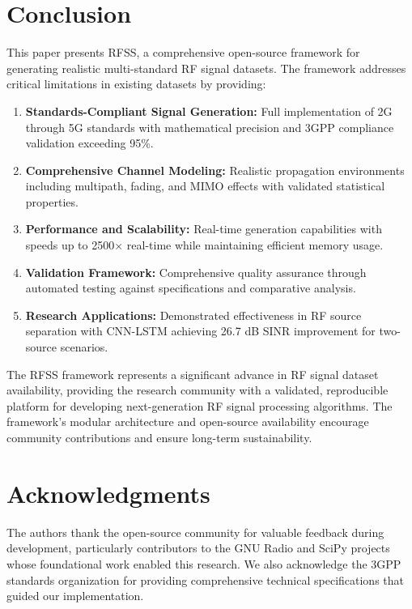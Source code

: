 \documentclass[twocolumn,10pt]{article}
\begin{document}
\section{Conclusion}

This paper presents RFSS, a comprehensive open-source framework for generating realistic multi-standard RF signal datasets. The framework addresses critical limitations in existing datasets by providing:

\begin{enumerate}
\item \textbf{Standards-Compliant Signal Generation:} Full implementation of 2G through 5G standards with mathematical precision and 3GPP compliance validation exceeding 95\%.

\item \textbf{Comprehensive Channel Modeling:} Realistic propagation environments including multipath, fading, and MIMO effects with validated statistical properties.

\item \textbf{Performance and Scalability:} Real-time generation capabilities with speeds up to 2500$\times$ real-time while maintaining efficient memory usage.

\item \textbf{Validation Framework:} Comprehensive quality assurance through automated testing against specifications and comparative analysis.

\item \textbf{Research Applications:} Demonstrated effectiveness in RF source separation with CNN-LSTM achieving 26.7 dB SINR improvement for two-source scenarios.
\end{enumerate}

The RFSS framework represents a significant advance in RF signal dataset availability, providing the research community with a validated, reproducible platform for developing next-generation RF signal processing algorithms. The framework's modular architecture and open-source availability encourage community contributions and ensure long-term sustainability.

\section*{Acknowledgments}

The authors thank the open-source community for valuable feedback during development, particularly contributors to the GNU Radio and SciPy projects whose foundational work enabled this research. We also acknowledge the 3GPP standards organization for providing comprehensive technical specifications that guided our implementation.
\end{document}
